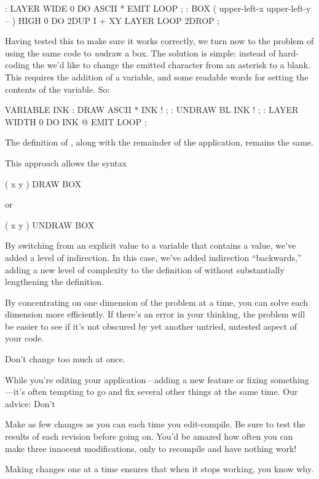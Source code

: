 \begin{Code}
: LAYER   WIDE  0 DO  ASCII * EMIT  LOOP ;
: BOX   ( upper-left-x  upper-left-y -- )
   HIGH  0 DO  2DUP  I +  XY LAYER  LOOP  2DROP ;
\end{Code}
Having tested this to make sure it works correctly, we turn now to the
problem of using the same code to \emph{un}draw a box. The solution is
simple: instead of hard-coding the  we'd like to change
the emitted character from an asterisk to a blank. This requires the
addition of a variable, and some readable words for setting the
contents of the variable. So:

\begin{Code}
VARIABLE INK
: DRAW   ASCII *  INK ! ;
: UNDRAW   BL  INK ! ;
: LAYER   WIDTH  0 DO  INK @  EMIT  LOOP ;
\end{Code}
The definition of , along with the remainder of the application,
remains the same.

This approach allows the syntax

\begin{Code}
( x y ) DRAW BOX
\end{Code}
or

\begin{Code}
( x y ) UNDRAW BOX
\end{Code}
By switching from an explicit value to a variable that contains a
value, we've added a level of indirection. In this case, we've added
indirection ``backwards,'' adding a new level of complexity to the
definition of  without substantially lengthening the definition.

By concentrating on one dimension of the problem at a time, you can
solve each dimension more efficiently. If there's an error in your
thinking, the problem will be easier to see if it's not obscured by yet
another untried, untested aspect of your code.

\begin{tip}
Don't change too much at once.
\end{tip}
While you're editing your application---adding a new feature or fixing
something---it's often tempting to go and fix several other things at
the same time. Our advice: Don't

Make as few changes as you can each time you edit-compile. Be sure to
test the results of each revision before going on. You'd be amazed how
often you can make three innocent modifications, only to recompile and
have nothing work!

Making changes one at a time ensures that when it stops working, you
know why.

